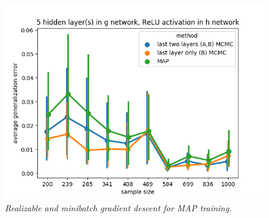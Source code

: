 \documentclass{article} %
\begin{document}
\begin{figure}[t!]
\begin{center}
		\includegraphics[scale=0.35]{taskid15.png}
	\end{center}
	\caption{\textit{Realizable and minibatch gradient descent for MAP training.}}
	\label{fig:avg_gen_err_minibatch_realizable}
\end{figure}


\begin{table}[h!]%
	\centering

	\caption{Companion to Figure \ref{fig:avg_gen_err_minibatch_realizable}.}%
	\label{table::avg_gen_err_minibatch_realizable}%
	\begin{tiny}
	\begin{subtable}[t]{2.5in}

		\caption{1 hidden layer(s) in $g$, identity activation in $h$}
		
	\end{subtable}
	\quad
	\begin{subtable}[t]{2.5in}
		\caption{5 hidden layer(s) in $g$, identity activation in $h$}
		
	\end{subtable}
	\quad 
	\begin{subtable}[t]{2.5in}
		\caption{1 hidden layer(s) in $g$, ReLU activation in $h$}
		
	\end{subtable}
	\quad
	\begin{subtable}[t]{2.5in}
		\caption{5 hidden layer(s) in $g$, ReLU activation in $h$}
		
	\end{subtable}
	\end{tiny}
\end{table}
\end{document}
